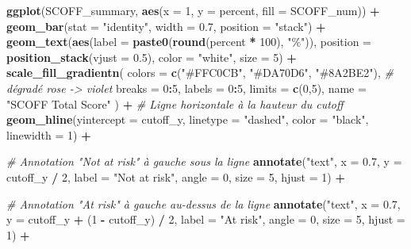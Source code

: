 \documentclass[
]{article}
\newenvironment{Shaded}{\begin{snugshade}}{\end{snugshade}}
\newcommand{\AttributeTok}[1]{\textcolor[rgb]{0.13,0.29,0.53}{#1}}
\newcommand{\CommentTok}[1]{\textcolor[rgb]{0.56,0.35,0.01}{\textit{#1}}}
\newcommand{\DecValTok}[1]{\textcolor[rgb]{0.00,0.00,0.81}{#1}}
\newcommand{\FloatTok}[1]{\textcolor[rgb]{0.00,0.00,0.81}{#1}}
\newcommand{\FunctionTok}[1]{\textcolor[rgb]{0.13,0.29,0.53}{\textbf{#1}}}
\newcommand{\NormalTok}[1]{#1}
\newcommand{\SpecialCharTok}[1]{\textcolor[rgb]{0.81,0.36,0.00}{\textbf{#1}}}
\newcommand{\StringTok}[1]{\textcolor[rgb]{0.31,0.60,0.02}{#1}}
\begin{document}
\begin{Shaded}
\begin{Highlighting}[]
\FunctionTok{ggplot}\NormalTok{(SCOFF\_summary, }\FunctionTok{aes}\NormalTok{(}\AttributeTok{x =} \DecValTok{1}\NormalTok{, }\AttributeTok{y =}\NormalTok{ percent, }\AttributeTok{fill =}\NormalTok{ SCOFF\_num)) }\SpecialCharTok{+}
  \FunctionTok{geom\_bar}\NormalTok{(}\AttributeTok{stat =} \StringTok{"identity"}\NormalTok{, }\AttributeTok{width =} \FloatTok{0.7}\NormalTok{, }\AttributeTok{position =} \StringTok{"stack"}\NormalTok{) }\SpecialCharTok{+}
  \FunctionTok{geom\_text}\NormalTok{(}\FunctionTok{aes}\NormalTok{(}\AttributeTok{label =} \FunctionTok{paste0}\NormalTok{(}\FunctionTok{round}\NormalTok{(percent }\SpecialCharTok{*} \DecValTok{100}\NormalTok{), }\StringTok{"\%"}\NormalTok{)),}
            \AttributeTok{position =} \FunctionTok{position\_stack}\NormalTok{(}\AttributeTok{vjust =} \FloatTok{0.5}\NormalTok{),}
            \AttributeTok{color =} \StringTok{"white"}\NormalTok{, }\AttributeTok{size =} \DecValTok{5}\NormalTok{) }\SpecialCharTok{+}
  \FunctionTok{scale\_fill\_gradientn}\NormalTok{(}
    \AttributeTok{colors =} \FunctionTok{c}\NormalTok{(}\StringTok{"\#FFC0CB"}\NormalTok{, }\StringTok{"\#DA70D6"}\NormalTok{, }\StringTok{"\#8A2BE2"}\NormalTok{),  }\CommentTok{\# dégradé rose {-}\textgreater{} violet}
    \AttributeTok{breaks =} \DecValTok{0}\SpecialCharTok{:}\DecValTok{5}\NormalTok{,}
    \AttributeTok{labels =} \DecValTok{0}\SpecialCharTok{:}\DecValTok{5}\NormalTok{,}
    \AttributeTok{limits =} \FunctionTok{c}\NormalTok{(}\DecValTok{0}\NormalTok{,}\DecValTok{5}\NormalTok{),}
    \AttributeTok{name =} \StringTok{"SCOFF Total Score"}
\NormalTok{  ) }\SpecialCharTok{+}
  \CommentTok{\# Ligne horizontale à la hauteur du cutoff}
  \FunctionTok{geom\_hline}\NormalTok{(}\AttributeTok{yintercept =}\NormalTok{ cutoff\_y, }\AttributeTok{linetype =} \StringTok{"dashed"}\NormalTok{, }\AttributeTok{color =} \StringTok{"black"}\NormalTok{, }\AttributeTok{linewidth =} \DecValTok{1}\NormalTok{) }\SpecialCharTok{+}
  
  \CommentTok{\# Annotation "Not at risk" à gauche sous la ligne}
  \FunctionTok{annotate}\NormalTok{(}\StringTok{"text"}\NormalTok{, }\AttributeTok{x =} \FloatTok{0.7}\NormalTok{, }\AttributeTok{y =}\NormalTok{ cutoff\_y }\SpecialCharTok{/} \DecValTok{2}\NormalTok{, }\AttributeTok{label =} \StringTok{"Not at risk"}\NormalTok{, }\AttributeTok{angle =} \DecValTok{0}\NormalTok{, }\AttributeTok{size =} \DecValTok{5}\NormalTok{, }\AttributeTok{hjust =} \DecValTok{1}\NormalTok{) }\SpecialCharTok{+}
  
  \CommentTok{\# Annotation "At risk" à gauche au{-}dessus de la ligne}
  \FunctionTok{annotate}\NormalTok{(}\StringTok{"text"}\NormalTok{, }\AttributeTok{x =} \FloatTok{0.7}\NormalTok{, }\AttributeTok{y =}\NormalTok{ cutoff\_y }\SpecialCharTok{+}\NormalTok{ (}\DecValTok{1} \SpecialCharTok{{-}}\NormalTok{ cutoff\_y) }\SpecialCharTok{/} \DecValTok{2}\NormalTok{, }\AttributeTok{label =} \StringTok{"At risk"}\NormalTok{, }\AttributeTok{angle =} \DecValTok{0}\NormalTok{, }\AttributeTok{size =} \DecValTok{5}\NormalTok{, }\AttributeTok{hjust =} \DecValTok{1}\NormalTok{) }\SpecialCharTok{+}
  

\end{Highlighting}
\end{Shaded}
\end{document}
